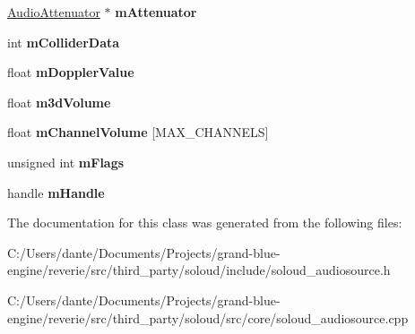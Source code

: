 \begin{DoxyCompactItemize}
\mbox{\label{class_so_loud_1_1_audio_source_instance3d_data_aa03eee66c2b601dd2a8a3d25db937476}} 
\mbox{\hyperlink{class_so_loud_1_1_audio_attenuator}{Audio\+Attenuator}} $\ast$ {\bfseries m\+Attenuator}
\item 
\mbox{\label{class_so_loud_1_1_audio_source_instance3d_data_a6234a25705806d11ac592fedf0a23dd1}} 
int {\bfseries m\+Collider\+Data}
\item 
\mbox{\label{class_so_loud_1_1_audio_source_instance3d_data_ac80ea416032cf6716fddc475252957bc}} 
float {\bfseries m\+Doppler\+Value}
\item 
\mbox{\label{class_so_loud_1_1_audio_source_instance3d_data_a68c3fd0171ee8236d091215cf3ce8eb8}} 
float {\bfseries m3d\+Volume}
\item 
\mbox{\label{class_so_loud_1_1_audio_source_instance3d_data_a7ba2af92eb1802f8a926e1b025ed433f}} 
float {\bfseries m\+Channel\+Volume} \mbox{[}M\+A\+X\+\_\+\+C\+H\+A\+N\+N\+E\+LS\mbox{]}
\item 
\mbox{\label{class_so_loud_1_1_audio_source_instance3d_data_acebb48b1a0c28291caa8278cf6bb52ea}} 
unsigned int {\bfseries m\+Flags}
\item 
\mbox{\label{class_so_loud_1_1_audio_source_instance3d_data_a36f1497ab59e11f86125eda3e8b799e8}} 
handle {\bfseries m\+Handle}
\end{DoxyCompactItemize}


The documentation for this class was generated from the following files\+:\begin{DoxyCompactItemize}
\item 
C\+:/\+Users/dante/\+Documents/\+Projects/grand-\/blue-\/engine/reverie/src/third\+\_\+party/soloud/include/soloud\+\_\+audiosource.\+h\item 
C\+:/\+Users/dante/\+Documents/\+Projects/grand-\/blue-\/engine/reverie/src/third\+\_\+party/soloud/src/core/soloud\+\_\+audiosource.\+cpp\end{DoxyCompactItemize}

